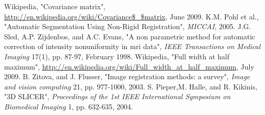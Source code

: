 \begin{thebibliography}{9999}
%
Wikipedia, "Covariance matrix", \url{http://en.wikipedia.org/wiki/Covariance$\_$matrix}, June 2009.
%
K.M. Pohl et al., "Automatic Segmentation Using Non-Rigid Registration", \textsl{MICCAI}, 2005.
%
J.G. Sled, A.P. Zijdenbos, and A.C. Evans, "A non parametric method for automatic correction of intensity nonuniformity in mri data", \textsl{IEEE Transactions on Medical Imaging} 17(1), pp. 87-97, February 1998.
%
Wikipedia, "Full width at half maximum", \url{http://en.wikipedia.org/wiki/Full_width_at_half_maximum}, July 2009.
%
B. Zitova, and J. Flusser, "Image registration methods: a survey", \textsl{Image and vision computing} 21, pp. 977-1000, 2003.
%
S. Pieper,M. Halle, and R. Kikinis, "3D SLICER", \textsl{Proceedings of the 1st IEEE International Symposium on Biomedical Imaging} 1, pp. 632-635, 2004.
%
\end{thebibliography}
